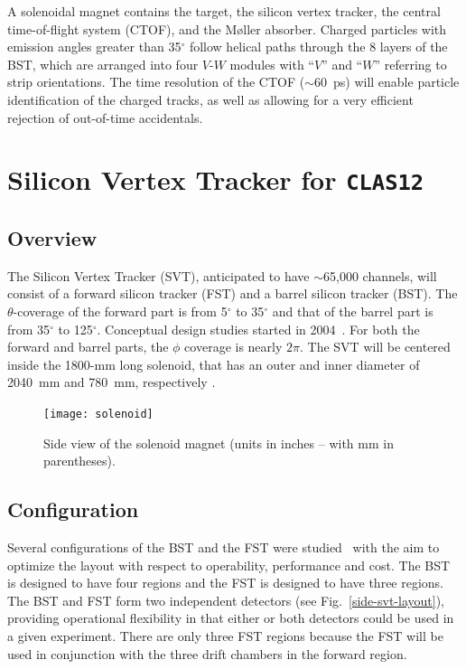 A solenoidal magnet contains the target, the silicon vertex tracker, the 
central time-of-flight system (CTOF), and the M{\o}ller absorber.  Charged 
particles with emission angles greater than 35$^\circ$ follow helical paths 
through the 8 layers of the BST, which are arranged into four $V$-$W$ modules 
with ``$V$'' and ``$W$'' referring to strip orientations.  The time resolution 
of the CTOF ($\sim$60~ps) will enable particle identification of the charged 
tracks, as well as allowing for a very efficient rejection of out-of-time 
accidentals.

\section{Silicon Vertex Tracker for {\tt CLAS12}}

\subsection{Overview}

The Silicon Vertex Tracker (SVT), anticipated to have $\sim$65,000 channels, 
will consist of a forward silicon tracker (FST) and a barrel silicon tracker 
(BST).  The $\theta$-coverage  of the forward part is from 5$^\circ$ to 
35$^\circ$ and that of the barrel part is from 35$^\circ$ to 125$^\circ$.  
Conceptual design studies started in 2004~\cite{CN2004-42}.  For both the 
forward and barrel parts, the $\phi$ coverage is nearly $2\pi$.  The SVT will 
be centered inside the 1800-mm long solenoid, that has an outer and inner 
diameter of 2040~mm and 780~mm, respectively
.
\begin{figure}[htbp]
\centering
\texttt{[image: solenoid]}
\caption{\small{Side view of the solenoid magnet (units in inches -- with mm 
in parentheses).}}
\label{fig:solenoid}
\end{figure}

\subsection{Configuration}

Several configurations of the BST and the FST were studied~\cite{CN2006-21} 
with the aim to optimize the layout with respect to operability, performance 
and cost.  The BST is designed to have four regions and the FST is designed 
to have three regions.  The BST and FST form two independent detectors (see
Fig.~\ref{side-svt-layout}), providing operational flexibility in that either 
or both detectors could be used in a given experiment. There are only three 
FST regions because the FST will be used in conjunction with the three drift 
chambers in the forward region.   

